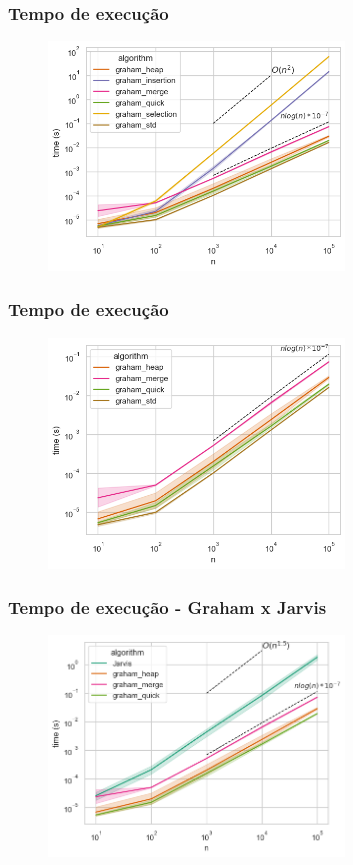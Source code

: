 \documentclass[aspectratio=169,usenames,dvipsnames]{beamer}
\begin{document}
\begin{frame}
\frametitle{Tempo de execução}
    \begin{figure}
        \includegraphics[width=0.7\textwidth]{./figures/circle_times.png}
    \end{figure}
\end{frame}

\begin{frame}
\frametitle{Tempo de execução}
    \begin{figure}
        \includegraphics[width=0.7\textwidth]{./figures/circle_times_nlogn.png}
    \end{figure}
\end{frame}

\begin{frame}
\frametitle{Tempo de execução - Graham x Jarvis}
    \begin{figure}
      \includegraphics[width=0.7\textwidth]{./figures/circle_times_2.png}
    \end{figure}
\end{frame}
\end{document}
